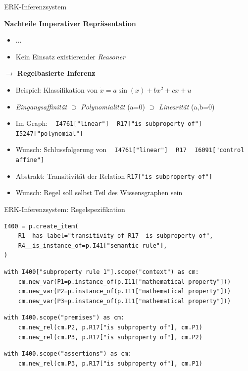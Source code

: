 \documentclass[
	ngerman,
	10pt,				%
	aspectratio=169 	%
]{beamer}
\newcommand\py\lstinline
\begin{document}
\begin{frame}[t,fragile,label=erk4]{\large ERK-Inferenzsystem}

\textbf{Nachteile Imperativer Repräsentation}
\begin{itemize}
 \item ...
 \item Kein Einsatz existierender \textit{Reasoner}
\end{itemize}

\pause

\bigskip
\textbf{$\rightarrow$ Regelbasierte Inferenz}
\begin{itemize}
 \item Beispiel: Klassifikation von $\dot x = a\sin(x) + bx^2 + c x + u$
 \item \textit{Eingangsaffinität} $\supset$ \textit{Polynomialität} (a=0) $\supset$ \textit{Linearität} (a,b=0)  
\pause
 \item Im Graph: ~ \py|I4761["linear"]| ~ \py|R17["is subproperty of"]| ~ \py|I5247["polynomial"]|
 \item Wunsch: Schlussfolgerung von ~ \py|I4761["linear"]| ~ \py|R17| ~ \py|I6091["control affine"]|
\pause
 \item Abstrakt: Transitivität der Relation \py|R17["is subproperty of"]|
 \smallskip
 \item Wunsch: Regel soll selbst Teil des Wissensgraphen sein
 
\end{itemize}

\end{frame}
  
\begin{frame}[t,fragile,label=erk6]{\large ERK-Inferenzsystem: Regelspezifikation}

\begin{lstlisting}
I400 = p.create_item(
    R1__has_label="transitivity of R17__is_subproperty_of",
    R4__is_instance_of=p.I41["semantic rule"],
)
\end{lstlisting}
\pause
\begin{lstlisting}
with I400["subproperty rule 1"].scope("context") as cm:
    cm.new_var(P1=p.instance_of(p.I11["mathematical property"]))
    cm.new_var(P2=p.instance_of(p.I11["mathematical property"]))
    cm.new_var(P3=p.instance_of(p.I11["mathematical property"]))
\end{lstlisting}
\pause
\begin{lstlisting}
with I400.scope("premises") as cm:
    cm.new_rel(cm.P2, p.R17["is subproperty of"], cm.P1)
    cm.new_rel(cm.P3, p.R17["is subproperty of"], cm.P2)
\end{lstlisting}
\pause
\begin{lstlisting}
with I400.scope("assertions") as cm:
    cm.new_rel(cm.P3, p.R17["is subproperty of"], cm.P1)
\end{lstlisting}

\end{frame}
  
\end{document}
